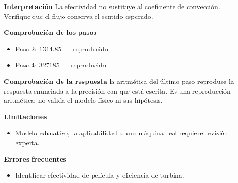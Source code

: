 \documentclass[10pt,openany]{book}
\begin{document}
\begin{tcolorbox}[title={Problema resuelto 3}, studiumworked, breakable]
\noindent\textbf{Interpretación}
La efectividad no sustituye al coeficiente de convección. Verifique que el flujo conserva el sentido esperado.

\noindent\textbf{Comprobación de los pasos}
\begin{itemize}
\item Paso 2: $1314.85$ — reproducido
\item Paso 4: $327185$ — reproducido
\end{itemize}

\noindent\textbf{Comprobación de la respuesta} la aritmética del último paso reproduce la respuesta enunciada a la precisión con que está escrita. Es una reproducción aritmética; no valida el modelo físico ni sus hipótesis.

\noindent\textbf{Limitaciones}
\begin{itemize}
\item Modelo educativo; la aplicabilidad a una máquina real requiere revisión experta.
\end{itemize}

\noindent\textbf{Errores frecuentes}
\begin{itemize}
\item Identificar efectividad de película y eficiencia de turbina.
\end{itemize}
\end{tcolorbox}
\end{document}
